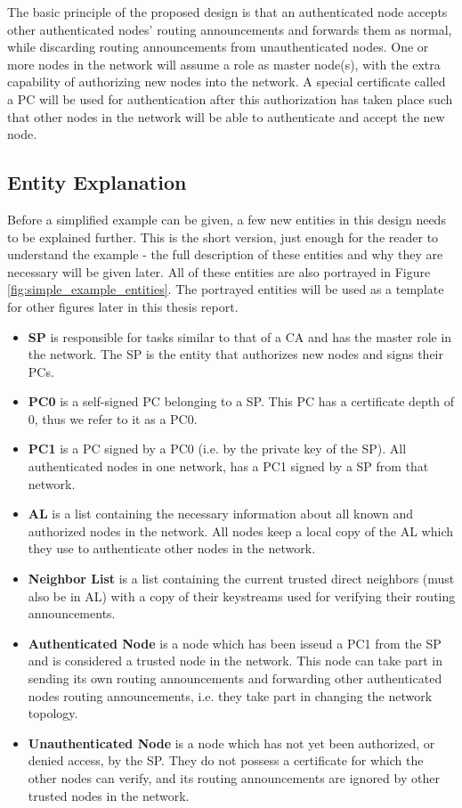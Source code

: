 The basic principle of the proposed design is that an authenticated node accepts
other authenticated nodes' routing announcements and forwards them as normal, while
discarding routing announcements from unauthenticated nodes. One or more nodes in the
network will assume a role as master node(s), with the extra capability of
authorizing new nodes into the network. A special certificate called a \ac{PC}
\cite{rfc3820} will be used for authentication after this authorization has taken
place such that other nodes in the network will be able to authenticate and
accept the new node.

\subsection{Entity Explanation}
Before a simplified example can be given, a few new entities in this design
needs to be explained further. This is the short version, just enough for the
reader to understand the example - the full description of these entities
and why they are necessary will be given later. All of these entities are also
portrayed in Figure \ref{fig:simple_example_entities}. The portrayed entities
will be used as a template for other figures later in this thesis report.

\begin{itemize}
  \item \textbf{\acf{SP}} is responsible for tasks similar to that of a \ac{CA}
  	and has the master role in the network. The \ac{SP} is the entity that
 	 authorizes new nodes and signs their \acp{PC}.
  \item \textbf{\acf{PC0}} is a self-signed \ac{PC} belonging to a
  	\ac{SP}. This \ac{PC} has a certificate depth of 0, thus we refer to it as a
  	\ac{PC0}.
  \item \textbf{\acf{PC1}} is a \ac{PC} signed by a \ac{PC0} (i.e. by the
  private key of the \ac{SP}). All authenticated nodes in one network, has a
  \ac{PC1} signed by a \ac{SP} from that network.
  \item \textbf{\acf{AL}} is a list containing the necessary information about
 	all known and authorized nodes in the network. All nodes keep a local copy of
 	the \ac{AL} which they use to authenticate other nodes in the network.
  \item \textbf{Neighbor List} is a list containing the current trusted direct
    neighbors (must also be in \ac{AL}) with a copy of their keystreams used for
    verifying their routing announcements.
  \item \textbf{Authenticated Node} is a node which has been isseud a \ac{PC1}
    from the \ac{SP} and is considered a trusted node in the network. This node
    can take part in sending its own routing announcements and forwarding other
    authenticated nodes routing announcements, i.e. they take part in changing
    the network topology.
  \item \textbf{Unauthenticated Node} is a node which has not yet been
    authorized, or denied access, by the \ac{SP}. They do not possess a
    certificate for which the other nodes can verify, and its routing
    announcements are ignored by other trusted nodes in the network.
\end{itemize}

